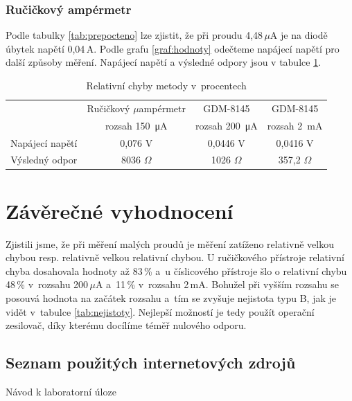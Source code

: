 \documentclass[a4paper,12pt]{article}   %
\newcommand{\tmu}{$\mu$}
\begin{document}
\subsubsection{Ručičkový ampérmetr}
Podle tabulky \ref{tab:prepocteno} lze zjistit, že při proudu 4,48\,\tmu A je na diodě úbytek napětí 0,04\,A. Podle grafu \ref{graf:hodnoty} odečteme napájecí napětí pro další způsoby měření. Napájecí napětí a výsledné odpory jsou v tabulce \ref{tab:napajeni}.
\begin{table}[h!]
    \centering
    \begin{tabular}{|c|c|c|c|}
        \hline
        \rule{0pt}{2.5ex}
        \multirow{2}{*}{} &Ručičkový \tmu ampérmetr	&GDM-8145 	&GDM-8145 \\[.7ex]
        & rozsah  150~μA & rozsah 200~μA & rozsah  2~mA \\\hline\hline
        Napájecí napětí & 0,076 V& 0,0446 V & 0,0416 V\\\hline
        Výsledný odpor & 8036 $\Omega$  & 1026 $\Omega$ & 357,2 $\Omega$   \\\hline
        
    \end{tabular}
    \caption{Relativní chyby metody v~procentech}
    \label{tab:napajeni}
\end{table}



\section{Závěrečné vyhodnocení}
Zjistili jsme, že při měření malých proudů je měření zatíženo relativně velkou chybou resp. relativně velkou relativní chybou. U ručičkového přístroje relativní chyba dosahovala hodnoty až 83\,\% a~u číslicového přístroje šlo o relativní chybu 48\,\% v~rozsahu 200\,\tmu A a~11\,\% v~rozsahu 2\,mA. Bohužel při vyšším rozsahu se posouvá hodnota na začátek rozsahu a~tím se zvyšuje nejistota typu B, jak je vidět v~tabulce \ref{tab:nejistoty}. Nejlepší možností je tedy použít operační zesilovač, díky kterému docílíme téměř nulového odporu.



\clearpage
\renewcommand{\refname}{Seznam použité literatury a~zdrojů informací} 

\begin{thebibliography}{99}

\subsection*{Seznam použitých internetových zdrojů}
     Návod k laboratorní úloze
    
\end{thebibliography}
\end{document}
